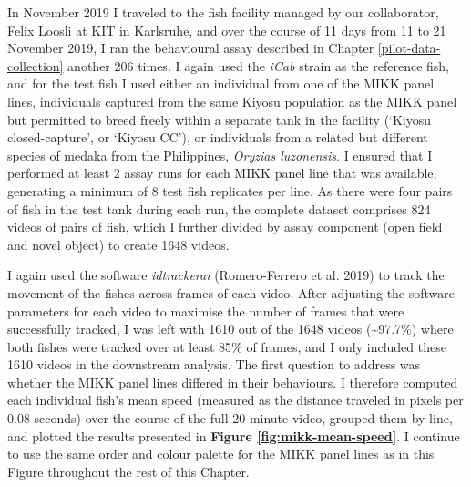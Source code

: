 \documentclass[
]{book}
\begin{document}
In November 2019 I traveled to the fish facility managed by our collaborator, Felix Loosli at KIT in Karlsruhe, and over the course of 11 days from 11 to 21 November 2019, I ran the behavioural assay described in Chapter \ref{pilot-data-collection} another 206 times. I again used the \emph{\textcolor{iCab_424B4D}{iCab}} strain as the reference fish, and for the test fish I used either an individual from one of the MIKK panel lines, individuals captured from the same Kiyosu population as the MIKK panel but permitted to breed freely within a separate tank in the facility (`Kiyosu closed-capture', or `Kiyosu CC'), or individuals from a related but different species of medaka from the Philippines, \emph{Oryzias luzonensis}. I ensured that I performed at least 2 assay runs for each MIKK panel line that was available, generating a minimum of 8 test fish replicates per line. As there were four pairs of fish in the test tank during each run, the complete dataset comprises 824 videos of pairs of fish, which I further divided by assay component (open field and novel object) to create 1648 videos.

I again used the software \emph{idtrackerai} (Romero-Ferrero et al. 2019) to track the movement of the fishes across frames of each video. After adjusting the software parameters for each video to maximise the number of frames that were successfully tracked, I was left with 1610 out of the 1648 videos (\textasciitilde97.7\%) where both fishes were tracked over at least 85\% of frames, and I only included these 1610 videos in the downstream analysis. The first question to address was whether the MIKK panel lines differed in their behaviours. I therefore computed each individual fish's mean speed (measured as the distance traveled in pixels per 0.08 seconds) over the course of the full 20-minute video, grouped them by line, and plotted the results presented in \textbf{Figure \ref{fig:mikk-mean-speed}}. I continue to use the same order and colour palette for the MIKK panel lines as in this Figure throughout the rest of this Chapter.
\end{document}
